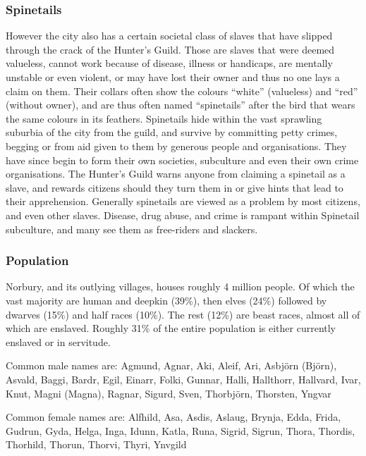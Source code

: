\subsubsection{Spinetails}
\label{sec:Spinetails}

However the city also has a certain societal class of slaves that have slipped
through the crack of the Hunter's Guild. Those are slaves that were deemed
valueless, cannot work because of disease, illness or handicaps, are mentally
unstable or even violent, or may have lost their owner and thus no one lays a
claim on them. Their collars often show the colours ``white'' (valueless) and
``red'' (without owner), and are thus often named ``spinetails'' after the
bird that wears the same colours in its feathers. Spinetails hide within the
vast sprawling suburbia of the city from the guild, and survive by committing
petty crimes, begging or from aid given to them by generous people and
organisations. They have since begin to form their own societies, subculture
and even their own crime organisations. The Hunter's Guild warns anyone from
claiming a spinetail as a slave, and rewards citizens should they turn them in
or give hints that lead to their apprehension. Generally spinetails are viewed
as a problem by most citizens, and even other slaves. Disease, drug abuse, and
crime is rampant within Spinetail subculture, and many see them as free-riders
and slackers.

\subsubsection{Population}

Norbury, and its outlying villages, houses roughly 4 million people. Of which
the vast majority are human and deepkin (39\%), then elves (24\%) followed by
dwarves (15\%) and half races (10\%). The rest (12\%) are beast races, almost
all of which are enslaved. Roughly 31\% of the entire population is either
currently enslaved or in servitude.

Common male names are: Agmund, Agnar, Aki, Aleif, Ari, Asbjörn (Björn),
Asvald, Baggi, Bardr, Egil, Einarr, Folki, Gunnar, Halli, Hallthorr, Hallvard,
Ivar, Knut, Magni (Magna), Ragnar, Sigurd, Sven, Thorbjörn, Thorsten, Yngvar

Common female names are: Alfhild, Asa, Asdis, Aslaug, Brynja, Edda, Frida,
Gudrun, Gyda, Helga, Inga, Idunn, Katla, Runa, Sigrid, Sigrun, Thora,
Thordis, Thorhild, Thorun, Thorvi, Thyri, Ynvgild
